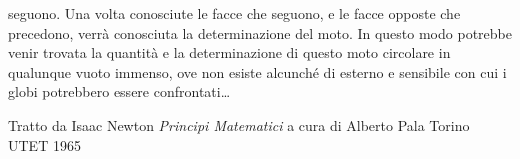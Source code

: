 \documentclass[a4paper,10pt,oneside]{article}
\begin{document}
seguono. Una volta conosciute le facce che seguono, e le facce opposte che precedono, verrà conosciuta la determinazione del moto. In questo modo potrebbe venir trovata la quantità e la determinazione di questo moto circolare  in qualunque vuoto immenso, ove non esiste alcunché di esterno e sensibile con cui i globi potrebbero essere confrontati\ldots

\vspace{1cm}

{\small Tratto da Isaac Newton \emph{Principi Matematici} a cura di Alberto Pala Torino UTET 1965}
\end{document}
